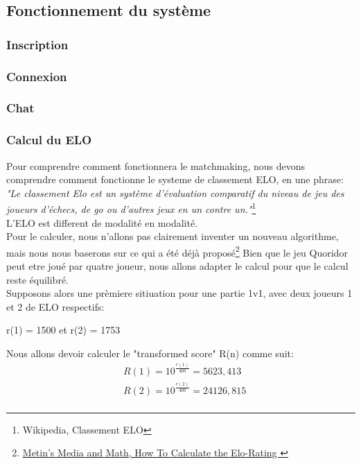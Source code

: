     \subsection{Fonctionnement du système}
        \subsubsection{Inscription}
        \subsubsection{Connexion}
        \subsubsection{Chat}
        \subsubsection{Calcul du ELO}
        Pour comprendre comment fonctionnera le matchmaking, nous devons comprendre comment fonctionne le systeme de classement ELO, en une phrase:
        \textit{"Le classement Elo est un système d’évaluation comparatif du niveau de jeu des joueurs d’échecs, de go ou d’autres jeux en un contre un."}\footnote{Wikipedia, Classement ELO} \\
        L'ELO est different de modalité en modalité. \\
        Pour le calculer, nous n'allons pas clairement inventer un nouveau algorithme, mais nous nous baserons sur ce qui a été déjà proposé\footnote{\href{https://metinmediamath.wordpress.com/2013/11/27/how-to-calculate-the-elo-rating-including-example/}{Metin's Media and Math, How To Calculate the Elo-Rating }}
        Bien que le jeu Quoridor peut etre joué par quatre joueur, nous allons adapter le calcul pour que le calcul reste équilibré. \\
        Supposons alors une prèmiere sitiuation pour une partie 1v1, avec deux joueurs 1 et 2 de ELO respectifs: 
    \begin{center}
        r(1) = 1500 et r(2) = 1753
    \end{center}
    Nous allons devoir calculer le "transformed score" R(n) comme suit:
    \begin{equation}
        \begin{split}
            & R(1) = 10^{\frac{r(1)}{400}} = 5623,413 \\
            & R(2) = 10^{\frac{r(2)}{400}} = 24126,815 \\
        \end{split}
    \end{equation}

